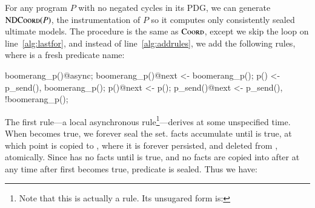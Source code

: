 

For any \lang program $P$ with no negated cycles in its PDG, we can generate $\textsc{NDCoord}(P)$, the instrumentation of $P$ so it computes only consistently sealed ultimate models.  The procedure is the same as $\textsc{Coord}$, except we skip the loop on line~\ref{alg:lastfor}, and instead of line~\ref{alg:addrules}, we add the following rules, where  is a fresh predicate name:

\begin{Dedalus}
boomerang_p()@async;
boomerang_p()@next <- boomerang_p();
p() <- p_send(), boomerang_p();
p()@next <- p();
p_send()@next <- p_send(), !boomerang_p();
\end{Dedalus}

The first rule---a local asynchronous rule\footnote{Note that this is actually a rule.  Its unsugared form is: \linebreak {}}---derives  at some unspecified time.  When  becomes true, we forever seal the  set.   facts accumulate until  is true, at which point  is copied to , where it is forever persisted, and deleted from , atomically.  Since  has no  facts until  is true, and no  facts are copied into  after at any time after  first becomes true, predicate  is sealed.  Thus we have:

